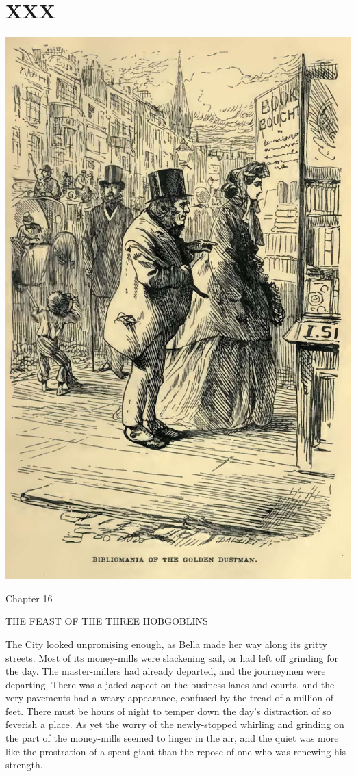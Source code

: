
\chapter{XXX}

\includegraphics[scale=2.3]{03-05-01}

Chapter 16

THE FEAST OF THE THREE HOBGOBLINS


The City looked unpromising enough, as Bella made her way along its
gritty streets. Most of its money-mills were slackening sail, or had
left off grinding for the day. The master-millers had already departed,
and the journeymen were departing. There was a jaded aspect on
the business lanes and courts, and the very pavements had a weary
appearance, confused by the tread of a million of feet. There must be
hours of night to temper down the day’s distraction of so feverish a
place. As yet the worry of the newly-stopped whirling and grinding on
the part of the money-mills seemed to linger in the air, and the quiet
was more like the prostration of a spent giant than the repose of one
who was renewing his strength.

